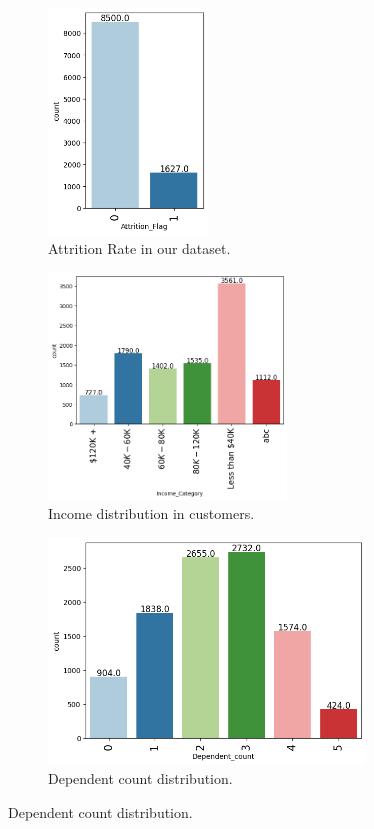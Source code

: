 \documentclass[10pt,a4paper]{style}
\begin{document}
	\begin{figure}[h]
		\centering
		\begin{subfigure}[t]{0.3\textwidth}
			\includegraphics[width=\textwidth,height=6cm]{Attrition_Flag.png}
			\caption{Attrition Rate in our dataset.}
			\label{fig:Attrition_Flag}
		\end{subfigure}
		\hfill
		\begin{subfigure}[t]{0.3\textwidth}
			\includegraphics[width=\textwidth,height=6cm]{Income_Category.png}
			\caption{Income distribution in customers.}
			\label{fig:Income_Category}
		\end{subfigure}
		\hfill
		\begin{subfigure}[t]{0.3\textwidth}
			\includegraphics[width=\textwidth,height=6cm]{Dependent_count.png}
			\caption{Dependent count distribution.}

\end{subfigure}
\end{figure}
\end{document}
